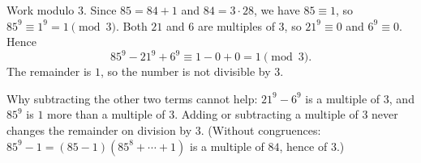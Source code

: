 Work modulo $3$. Since $85=84+1$ and $84=3\cdot28$, we have $85\equiv1$, so $85^9\equiv1^9=1\pmod 3$. Both $21$ and $6$ are multiples of $3$, so $21^9\equiv0$ and $6^9\equiv0$. Hence
\[
85^9-21^9+6^9\equiv1-0+0=1\pmod 3 .
\]
The remainder is $\boxed{1}$, so the number is not divisible by $3$.

Why subtracting the other two terms cannot help: $21^9-6^9$ is a multiple of $3$, and $85^9$ is $1$ more than a multiple of $3$. Adding or subtracting a multiple of $3$ never changes the remainder on division by $3$. (Without congruences: $85^9-1=(85-1)(85^8+\cdots+1)$ is a multiple of $84$, hence of $3$.)
